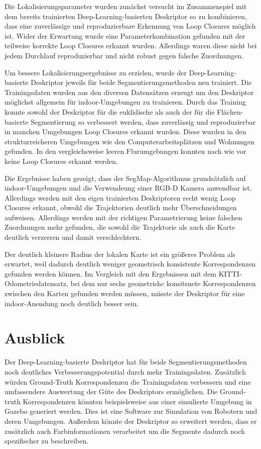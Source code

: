 Die Lokalisierungsparameter wurden zunächst versucht im Zusammenspiel mit dem bereits trainierten Deep-Learning-basierten Deskriptor so zu kombinieren, dass eine zuverlässige und reproduzierbare Erkennung von Loop Closures möglich ist. Wider der Erwartung wurde eine Parameterkombination gefunden mit der teilweise korrekte Loop Closures erkannt wurden. Allerdings waren diese nicht bei jedem Durchlauf reproduzierbar und nicht robust gegen falsche Zuordnungen. 

Um bessere Lokalisierungsergebnisse zu erzielen, wurde der Deep-Learning-basierte Deskriptor jeweils für beide Segmentierungsmethoden neu trainiert. Die Trainingsdaten wurden aus den diversen Datensätzen erzeugt um den Deskriptor möglichst allgemein für indoor-Umgebungen zu trainieren. Durch das Training konnte sowohl der Deskriptor für die euklidische als auch der für die Flächen-basierte Segmentierung so verbessert werden, dass zuverlässig und reproduzierbar in manchen Umgebungen Loop Closures erkannt wurden. Diese wurden in den strukturreicheren Umgebungen wie den Computerarbeitsplätzen und Wohnungen gefunden. In den vergleichsweise leeren Flurumgebungen konnten nach wie vor keine Loop Closures erkannt werden.

Die Ergebnisse haben gezeigt, dass der SegMap-Algorithmus grundsätzlich auf indoor-Umgebungen und die Verwendeung einer RGB-D Kamera anwendbar ist. Al\-ler\-dings werden mit den eigen trainierten Deskriptoren recht wenig Loop Closures erkannt, obwohl die Trajektorien deutlich mehr Überschneidungen aufweisen. Allerdings werden mit der richtigen Parametrierung keine falschen Zuordnungen mehr gefunden, die sowohl die Trajektorie als auch die Karte deutlich verzerren und damit verschlechtern. 

Der deutlich kleinere Radius der lokalen Karte ist ein größeres Problem als erwartet, weil dadurch deutlich weniger geometrisch konsistente Korrespondenzen gefunden werden können. Im Vergleich mit den Ergebnissen mit dem KITTI-Odometriedatensatz, bei dem nur sechs geometrishc konsitsnete Korrespondenzen zwischen den Karten gefunden werden müssen, müsste der Deskriptor für eine indoor-Anendung noch deutlich besser sein. 

\section[Ausblick (Kopp, Schmelzer)]{Ausblick}

Der Deep-Learning-basierte Deskriptor hat für beide Segmentierungsmethoden noch deutliches Verbesserungspotential durch mehr Trainingsdaten. Zusätzlich würden \linebreak Ground-Truth Korrespondenzen die Trainingsdaten verbessern und eine umfassendere Auswertung der Güte des Deskriptors ermöglichen. Die Ground-truth Korrespondenzen könnten beispielsweise aus einer simulierte Umgebung in Gazebo generiert werden. Dies ist eine Software zur Simulation von Robotern und deren Umgebungen. 
Außerdem könnte der Deskriptor so erweitert werden, dass er zusätzlich auch Farbinformationen verarbeitet um die Segmente dadurch noch spezifischer zu beschreiben. 

